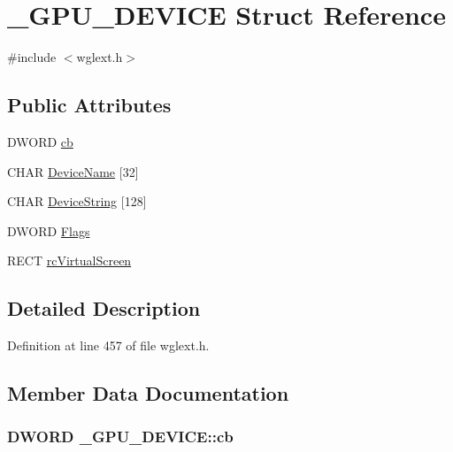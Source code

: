 \hypertarget{struct___g_p_u___d_e_v_i_c_e}{\section{\+\_\+\+G\+P\+U\+\_\+\+D\+E\+V\+I\+C\+E Struct Reference}
\label{struct___g_p_u___d_e_v_i_c_e}
}


{\ttfamily \#include $<$wglext.\+h$>$}

\subsection*{Public Attributes}
\begin{DoxyCompactItemize}
\item 
D\+W\+O\+R\+D \hyperlink{struct___g_p_u___d_e_v_i_c_e_afcb22f16ba9e526610489ff56ab78ddb}{cb}
\item 
C\+H\+A\+R \hyperlink{struct___g_p_u___d_e_v_i_c_e_a604bfab61f1a2c5d1e635837d369ba14}{Device\+Name} \mbox{[}32\mbox{]}
\item 
C\+H\+A\+R \hyperlink{struct___g_p_u___d_e_v_i_c_e_aff8b7920ccc85afcd6f325da6cdb0b73}{Device\+String} \mbox{[}128\mbox{]}
\item 
D\+W\+O\+R\+D \hyperlink{struct___g_p_u___d_e_v_i_c_e_a008db9d0f5fc13a5160805f40465f14a}{Flags}
\item 
R\+E\+C\+T \hyperlink{struct___g_p_u___d_e_v_i_c_e_aeb573bbeb3b6c589246720ef259b9a27}{rc\+Virtual\+Screen}
\end{DoxyCompactItemize}


\subsection{Detailed Description}


Definition at line 457 of file wglext.\+h.



\subsection{Member Data Documentation}
\hypertarget{struct___g_p_u___d_e_v_i_c_e_afcb22f16ba9e526610489ff56ab78ddb}{
\subsubsection[{cb}]{\setlength{\rightskip}{0pt plus 5cm}D\+W\+O\+R\+D \+\_\+\+G\+P\+U\+\_\+\+D\+E\+V\+I\+C\+E\+::cb}}\label{struct___g_p_u___d_e_v_i_c_e_afcb22f16ba9e526610489ff56ab78ddb}


